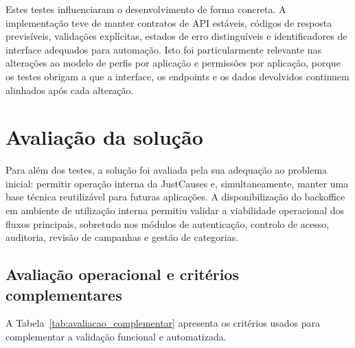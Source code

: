 Estes testes influenciaram o desenvolvimento de forma concreta. A implementação teve de manter contratos de \gls{API} estáveis, códigos de resposta previsíveis, validações explícitas, estados de erro distinguíveis e identificadores de interface adequados para automação. Isto foi particularmente relevante nas alterações ao modelo de perfis por aplicação e permissões por aplicação, porque os testes obrigam a que a interface, os endpoints e os dados devolvidos continuem alinhados após cada alteração.


\section{Avaliação da solução}
\label{sec:avaliacao}

Para além dos testes, a solução foi avaliada pela sua adequação ao problema inicial: permitir operação interna da JustCauses e, simultaneamente, manter uma base técnica reutilizável para futuras aplicações. A disponibilização do backoffice em ambiente de utilização interna permitiu validar a viabilidade operacional dos fluxos principais, sobretudo nos módulos de autenticação, controlo de acesso, auditoria, revisão de campanhas e gestão de categorias.

\subsection{Avaliação operacional e critérios complementares}
\label{subsec:avaliacao_complementar}

A Tabela~\ref{tab:avaliacao_complementar} apresenta os critérios usados para complementar a validação funcional e automatizada.

